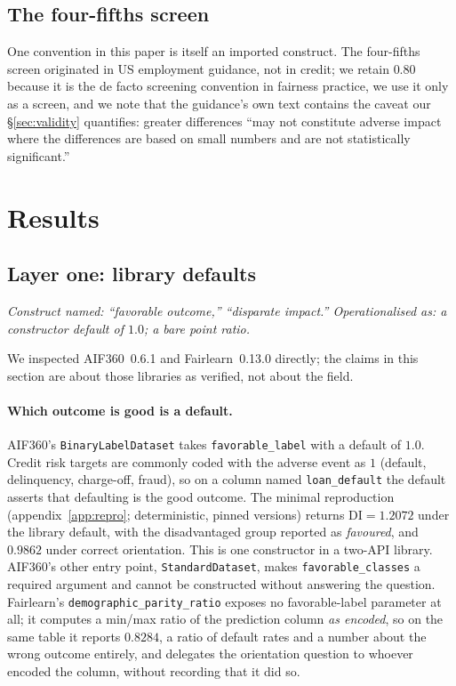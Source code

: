 \documentclass[sigconf,nonacm]{acmart}
\begin{document}
\subsection{The four-fifths screen}
One convention in this paper is itself an imported construct. The
four-fifths screen originated in US employment
guidance, not in credit; we retain $0.80$ because it is the de facto screening
convention in fairness practice, we use it only as a screen, and we note that
the guidance's own text contains the caveat our \S\ref{sec:validity}
quantifies: greater differences ``may not constitute adverse impact where the
differences are based on small numbers and are not statistically
significant.''

\section{Results}
\label{sec:results}

\subsection{Layer one: library defaults}
\label{sec:library}

\emph{Construct named: ``favorable outcome,'' ``disparate impact.''
Operationalised as: a constructor default of $1.0$; a bare point ratio.}

We inspected AIF360~0.6.1 and Fairlearn~0.13.0 directly; the claims in this
section are about those libraries as verified, not about the field.

\paragraph{Which outcome is good is a default.} AIF360's
\texttt{BinaryLabelDataset} takes \texttt{favorable\_label} with a default of
$1.0$. Credit risk targets are commonly coded with the adverse event as
$1$ (default, delinquency, charge-off, fraud), so on a column named
\texttt{loan\_default} the default asserts that defaulting is the good
outcome. The minimal reproduction (appendix~\ref{app:repro}; deterministic,
pinned versions) returns $\mathrm{DI}=1.2072$ under the library default, with
the disadvantaged group reported as \emph{favoured}, and $0.9862$ under
correct orientation. This is one constructor in a two-API library. AIF360's other entry
point, \texttt{StandardDataset}, makes \texttt{favorable\_classes} a required
argument and cannot be constructed without answering the question. Fairlearn's
\texttt{demographic\_parity\_ratio} exposes no favorable-label parameter at
all; it computes a min/max ratio of the prediction column \emph{as encoded},
so on the same table it reports $0.8284$, a ratio of default rates and a
number about the wrong outcome entirely, and delegates the orientation
question to whoever encoded the column, without recording that it did so.
\end{document}
